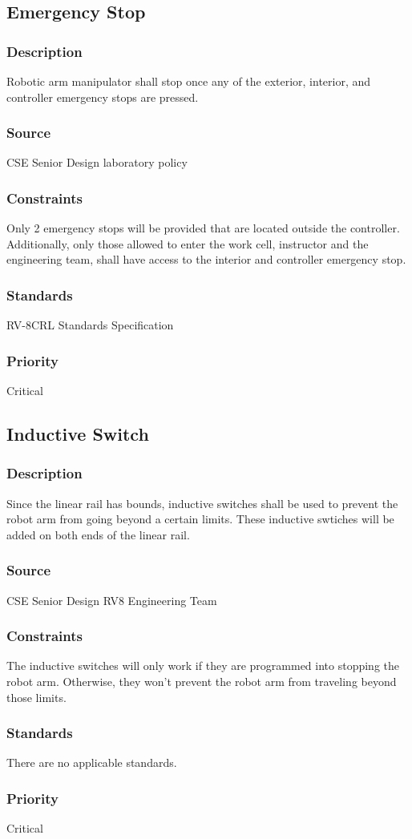 \subsection{Emergency Stop}
\subsubsection{Description}
Robotic arm manipulator shall stop once any of the exterior, interior, and controller emergency stops are pressed.
\subsubsection{Source}
CSE Senior Design laboratory policy
\subsubsection{Constraints}
Only 2 emergency stops will be provided that are located outside the controller. Additionally, only those allowed to enter the work cell, instructor and the engineering team, shall have access to the interior and controller emergency stop.
\subsubsection{Standards}
RV-8CRL Standards Specification
\subsubsection{Priority}
Critical

\subsection{Inductive Switch}
\subsubsection{Description}
Since the linear rail has bounds, inductive switches shall be used to prevent the robot arm from going beyond a certain limits. These inductive swtiches will be added on both ends of the linear rail.
\subsubsection{Source}
CSE Senior Design RV8 Engineering Team
\subsubsection{Constraints}
The inductive switches will only work if they are programmed into stopping the robot arm. Otherwise, they won't prevent the robot arm from traveling beyond those limits.
\subsubsection{Standards}
There are no applicable standards.
\subsubsection{Priority}
Critical
